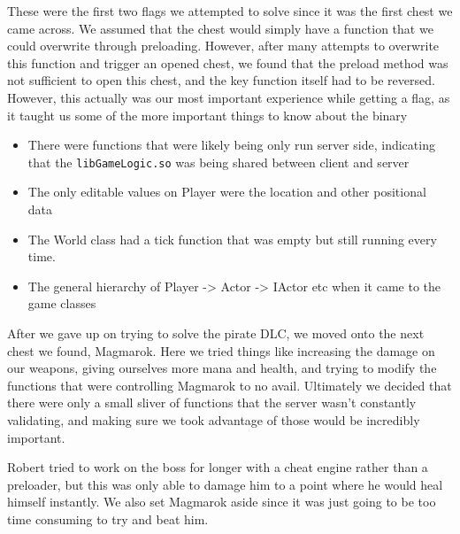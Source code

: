 \documentclass[11pt]{article}
\begin{document}
These were the first two flags we attempted to solve since it was the first chest we came across. We assumed that the chest would simply have a function that we could overwrite through preloading. However, after many attempts to overwrite this function and trigger an opened chest, we found that the preload method was not sufficient to open this chest, and the key function itself had to be reversed. However, this actually was our most important experience while getting a flag, as it taught us some of the more important things to know about the binary
\begin{itemize}
    \item There were functions that were likely being only run server side, indicating that the \texttt{libGameLogic.so} was being shared between client and server
    \item The only editable values on Player were the location and other positional data
    \item The World class had a tick function that was empty but still running every time.
    \item The general hierarchy of Player -> Actor -> IActor etc when it came to the game classes
\end{itemize}

After we gave up on trying to solve the pirate DLC, we moved onto the next chest we found, Magmarok. Here we tried things like increasing the damage on our weapons, giving ourselves more mana and health, and trying to modify the functions that were controlling Magmarok to no avail. Ultimately we decided that there were only a small sliver of functions that the server wasn't constantly validating, and making sure we took advantage of those would be incredibly important. 

Robert tried to work on the boss for longer with a cheat engine rather than a preloader, but this was only able to damage him to a point where he would heal himself instantly. We also set Magmarok aside since it was just going to be too time consuming to try and beat him.
\end{document}
